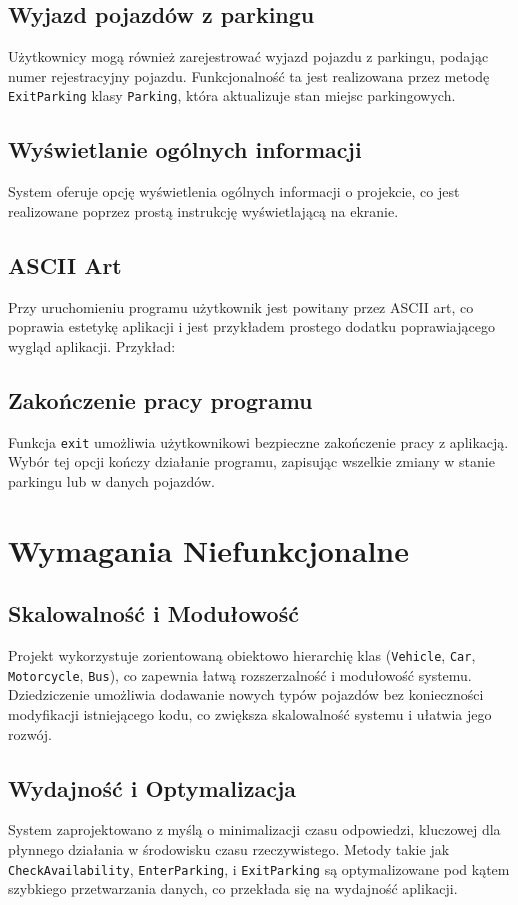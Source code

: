 \documentclass{article}
\begin{document}
\subsection{Wyjazd pojazdów z parkingu}
Użytkownicy mogą również zarejestrować wyjazd pojazdu z parkingu, podając numer rejestracyjny pojazdu. Funkcjonalność ta jest realizowana przez metodę \texttt{ExitParking} klasy \texttt{Parking}, która aktualizuje stan miejsc parkingowych.

\subsection{Wyświetlanie ogólnych informacji}
System oferuje opcję wyświetlenia ogólnych informacji o projekcie, co jest realizowane poprzez prostą instrukcję wyświetlającą na ekranie.

\subsection{ASCII Art}
Przy uruchomieniu programu użytkownik jest powitany przez ASCII art, co poprawia estetykę aplikacji i jest przykładem prostego dodatku poprawiającego wygląd aplikacji. Przykład:



\subsection{Zakończenie pracy programu}
Funkcja \texttt{exit} umożliwia użytkownikowi bezpieczne zakończenie pracy z aplikacją. Wybór tej opcji kończy działanie programu, zapisując wszelkie zmiany w stanie parkingu lub w danych pojazdów.

\section{Wymagania Niefunkcjonalne}

\subsection{Skalowalność i Modułowość}
Projekt wykorzystuje zorientowaną obiektowo hierarchię klas (\texttt{Vehicle}, \texttt{Car}, \texttt{Motorcycle}, \texttt{Bus}), co zapewnia łatwą rozszerzalność i modułowość systemu. Dziedziczenie umożliwia dodawanie nowych typów pojazdów bez konieczności modyfikacji istniejącego kodu, co zwiększa skalowalność systemu i ułatwia jego rozwój.

\subsection{Wydajność i Optymalizacja}
System zaprojektowano z myślą o minimalizacji czasu odpowiedzi, kluczowej dla płynnego działania w środowisku czasu rzeczywistego. Metody takie jak \texttt{CheckAvailability}, \texttt{EnterParking}, i \texttt{ExitParking} są optymalizowane pod kątem szybkiego przetwarzania danych, co przekłada się na wydajność aplikacji.
\end{document}

